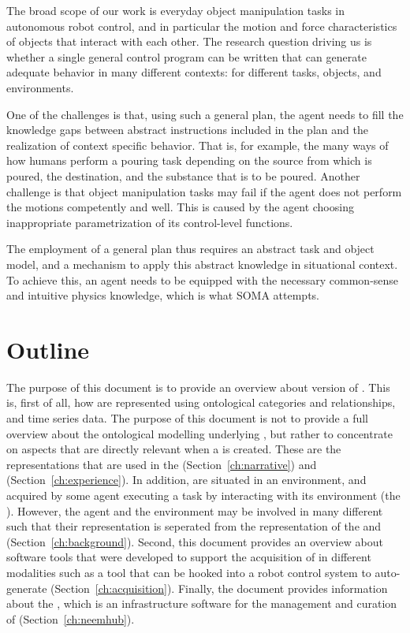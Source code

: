 The broad scope of our work is everyday object manipulation tasks in autonomous robot control, and in particular the motion and force characteristics of objects that interact with each other.
The research question driving us is whether a single general control program can be written that can generate adequate behavior in many different contexts: for different tasks, objects, and environments.

One of the challenges is that, using such a general plan, the agent needs to fill the knowledge gaps between abstract instructions included in the plan and the realization of context specific behavior. That is, for example, the many ways of how humans perform a pouring task depending on the source from which is poured, the destination, and the substance that is to be poured.
Another challenge is that object manipulation tasks may fail if the agent does not perform the motions competently and well. This is caused by the agent choosing inappropriate parametrization of its control-level functions.

The employment of a general plan thus requires an abstract task and object model, and a mechanism to apply this abstract knowledge in situational context.
To achieve this, an agent needs to be equipped with the necessary common-sense and intuitive physics knowledge, which is what SOMA attempts.

\section{Outline} %
The purpose of this document is to provide an overview about version \neemversion of \neems.
This is, first of all, how \neems are represented using ontological categories and relationships, and time series data.
The purpose of this document is not to provide a full overview about the ontological modelling underlying \neems, but rather to concentrate on aspects that are directly relevant when a \neem is created.
These are the representations that are used in the \neemnar (Section~\ref{ch:narrative}) and \neemexp (Section~\ref{ch:experience}).
In addition, \neems are situated in an environment, and acquired by some agent executing a task by interacting with its environment (the \neembak).
However, the agent and the environment may be involved in many different \neems such that their representation is seperated from the representation of the \neemnar and \neemexp (Section~\ref{ch:background}).
Second, this document provides an overview about software tools that were developed to support the acquisition of \neems in different modalities such as a tool that can be hooked into a robot control system to auto-generate \neems (Section~\ref{ch:acquisition}).
Finally, the document provides information about the \neemhub, which is an infrastructure software for the management and curation of \neems (Section~\ref{ch:neemhub}).



